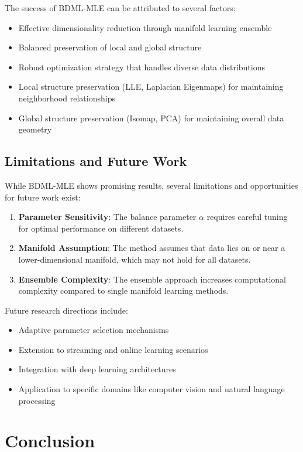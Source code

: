 \documentclass[review]{elsarticle}
\begin{document}
The success of BDML-MLE can be attributed to several factors:
\begin{itemize}
\item Effective dimensionality reduction through manifold learning ensemble
\item Balanced preservation of local and global structure
\item Robust optimization strategy that handles diverse data distributions
\item Local structure preservation (LLE, Laplacian Eigenmaps) for maintaining neighborhood relationships
\item Global structure preservation (Isomap, PCA) for maintaining overall data geometry
\end{itemize}

\subsection{Limitations and Future Work}

While BDML-MLE shows promising results, several limitations and opportunities for future work exist:

\begin{enumerate}
\item \textbf{Parameter Sensitivity}: The balance parameter $\alpha$ requires careful tuning for optimal performance on different datasets.

\item \textbf{Manifold Assumption}: The method assumes that data lies on or near a lower-dimensional manifold, which may not hold for all datasets.

\item \textbf{Ensemble Complexity}: The ensemble approach increases computational complexity compared to single manifold learning methods.
\end{enumerate}

Future research directions include:
\begin{itemize}
\item Adaptive parameter selection mechanisms
\item Extension to streaming and online learning scenarios
\item Integration with deep learning architectures
\item Application to specific domains like computer vision and natural language processing
\end{itemize}

\section{Conclusion}
\end{document}
